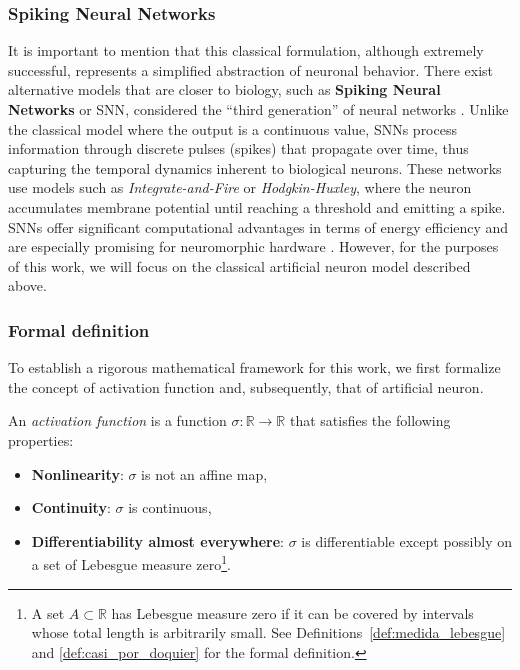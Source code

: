 \subsubsection{Spiking Neural Networks}

It is important to mention that this classical formulation, although extremely successful, represents a simplified abstraction of neuronal behavior. There exist alternative models that are closer to biology, such as \textbf{Spiking Neural Networks} or \gls{SNN}, considered the ``third generation'' of neural networks \citep{Maass1997spiking}. Unlike the classical model where the output is a continuous value, \glspl{SNN} process information through discrete pulses (spikes) that propagate over time, thus capturing the temporal dynamics inherent to biological neurons. These networks use models such as \textit{Integrate-and-Fire} or \textit{Hodgkin-Huxley}, where the neuron accumulates membrane potential until reaching a threshold and emitting a spike. \glspl{SNN} offer significant computational advantages in terms of energy efficiency and are especially promising for neuromorphic hardware \citep{Tavanaei2018deep}. However, for the purposes of this work, we will focus on the classical artificial neuron model described above.

\subsubsection{Formal definition}

To establish a rigorous mathematical framework for this work, we first formalize the concept of activation function and, subsequently, that of artificial neuron.

\begin{definition}\label{def:funcion_activacion}
	An \textit{activation function} is a function $\sigma: \mathbb{R} \to \mathbb{R}$ that satisfies the following properties:
	\begin{itemize}
		\item \textbf{Nonlinearity}: $\sigma$ is not an affine map,
		\item \textbf{Continuity}: $\sigma$ is continuous,
		\item \textbf{Differentiability almost everywhere}: $\sigma$ is differentiable except possibly on a set of Lebesgue measure zero\footnote{A set $A \subset \mathbb{R}$ has Lebesgue measure zero if it can be covered by intervals whose total length is arbitrarily small. See Definitions~\ref{def:medida_lebesgue} and \ref{def:casi_por_doquier} for the formal definition.}.
	\end{itemize}
\end{definition}

